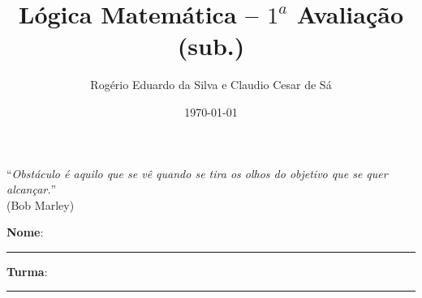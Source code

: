 \documentclass[12pt]{article}
\title{Lógica Matemática -- $1^a$ Avaliação (sub.)}
\author{Rogério Eduardo da Silva e Claudio Cesar de Sá}
\date{\today}
\begin{document}
\pagestyle{empty}
\maketitle


%


\begin{flushright}
``\textit{Obstáculo é aquilo que se vê quando se tira os olhos do objetivo que se quer alcançar.}''\\ (Bob Marley)
\end{flushright}

\begin{flushleft}
\textbf{Nome}: \rule{10cm}{0.2mm} \textbf{Turma}: \rule{1cm}{0.2mm}
\end{flushleft}
\end{document}
